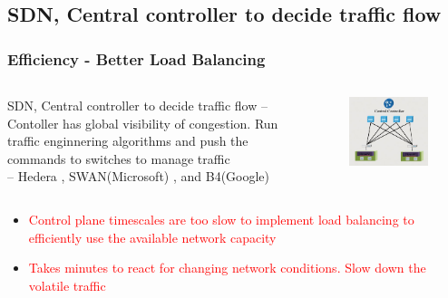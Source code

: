 \documentclass{beamer}
\begin{document}
\subsection{SDN, Central controller to decide traffic flow}
\begin{frame}
	\frametitle{Efficiency - Better Load Balancing}
	\begin{columns}[T] %
		\begin{column}[T]{7cm} 
			\begin{block}{SDN, Central controller to decide traffic flow}
				--  Contoller has global visibility of congestion. Run traffic enginnering algorithms and push the commands to switches to manage traffic\\
				--  Hedera , SWAN(Microsoft) ,
				and B4(Google)
			\end{block}
		\end{column}
		\begin{column}[T]{5cm} 
			\begin{figure}
				\includegraphics[scale=0.35]{5}
			\end{figure}
		\end{column}
	\end{columns}
	\medskip
	\begin{itemize}
		\item\textcolor{red}{Control plane timescales are too slow to implement load balancing to efficiently use the available network capacity} \\
		\item\textcolor{red}{Takes minutes to react for changing network conditions. Slow down the volatile traffic}
	\end{itemize}
\end{frame}
\end{document}
